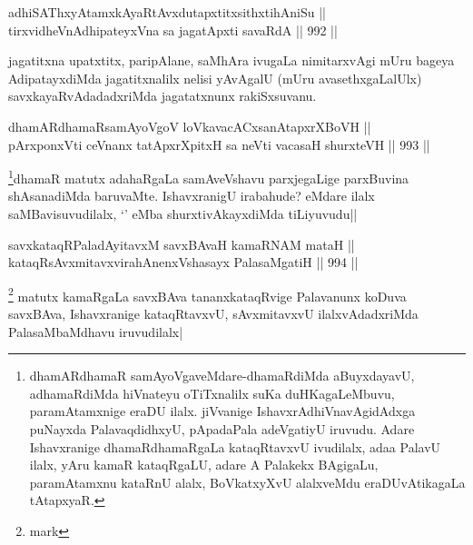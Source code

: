 \begin{shl}
adhiSAThxyA\s \s tamxkAyaRtAvxdutapxtitxsithxtihAniSu || \\
tirxvidheVnA\s \s dhipateyxVna sa jagatApxti savaRdA ||  992 ||  
\end{shl}

\begin{artha}
jagatitxna upatxtitx, paripAlane, saMhAra ivugaLa nimitarxvAgi mUru bageya AdipatayxdiMda jagatitxnalilx nelisi yAvAgalU (mUru avasethxgaLalUlx) savxkayaRvAdadadxriMda jagatatxnunx rakiSxsuvanu.
\end{artha}


\begin{shl}
dhamARdhamaRsamAyoVgoV loVkavacACxsanAtapxrXBoVH || \\
pArxponxVti ceVnanx tatApxrXpitxH sa neVti vacasaH shurxteVH ||  993 ||  
\end{shl}

\begin{artha}
\footnote{dhamARdhamaR samAyoVgaveMdare-dhamaRdiMda aBuyxdayavU, adhamaRdiMda hiVnateyu oTiTxnalilx suKa duHKagaLeMbuvu, paramAtamxnige eraDU ilalx. jiVvanige IshavxrAdhiVnavAgidAdxga puNayxda PalavaqdidhxyU, pApadaPala adeVgatiyU iruvudu. Adare Ishavxranige dhamaRdhamaRgaLa kataqRtavxvU ivudilalx, adaa PalavU ilalx, yAru kamaR kataqRgaLU, adare A Palakekx BAgigaLu, paramAtamxnu kataRnU alalx, BoVkatxyXvU alalxveMdu eraDUvAtikagaLa tAtapxyaR.}dhamaR matutx adahaRgaLa samAveVshavu parxjegaLige parxBuvina shAsanadiMda baruvaMte. IshavxranigU irabahude? eMdare ilalx saMBavisuvudilalx, `\stext' eMba shurxtivAkayxdiMda tiLiyuvudu||
\end{artha}

\begin{shl}
savxkataqRPaladAyitavxM savxBAvaH kamaRNAM mataH || \\
kataqRsAvxmitavxvirahAnenxVshasayx PalasaMgatiH ||  994 ||  
\end{shl}

\begin{artha}
\footnote{mark} matutx kamaRgaLa savxBAva tananxkataqRvige Palavanunx koDuva savxBAva, Ishavxranige kataqRtavxvU, sAvxmitavxvU ilalxvAdadxriMda PalasaMbaMdhavu iruvudilalx|
\end{artha}


